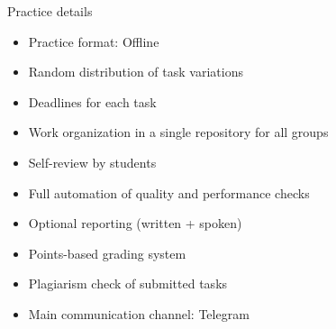 \documentclass{beamer}
\begin{document}
\begin{frame}{Practice details}
    \begin{itemize}
        \item Practice format: Offline
        \item Random distribution of task variations
        \item Deadlines for each task
        \item Work organization in a single repository for all groups
        \item Self-review by students
        \item Full automation of quality and performance checks
        \item Optional reporting (written + spoken)
        \item Points-based grading system
        \item Plagiarism check of submitted tasks
        \item Main communication channel: Telegram
    \end{itemize}
\end{frame}
\end{document}
